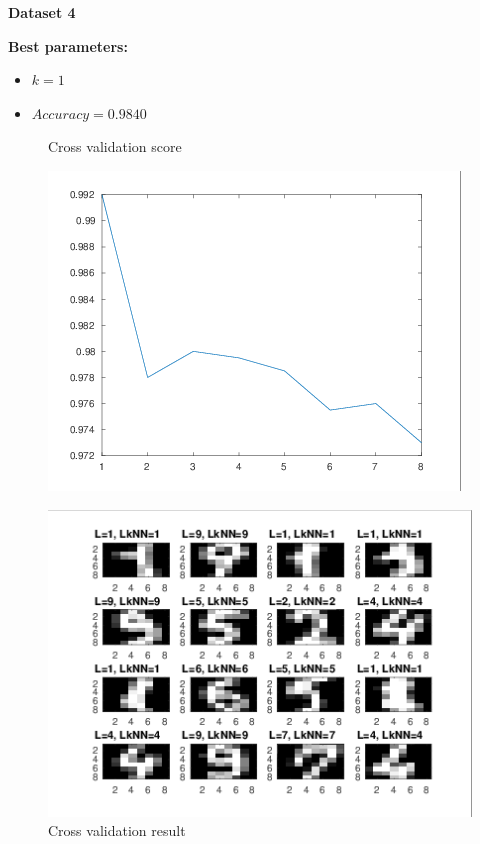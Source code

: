 \documentclass[a4paper,12pt]{article}
\begin{document}
\noindent \textbf{Dataset 4}

\textbf{Best parameters:}
\begin{itemize}
\item $k = 1$
\item $Accuracy = 0.9840$
\end{itemize}

\begin{figure}[H]
\centering
  \begin{minipage}[]{0.49\textwidth}
  \caption{Cross validation score}\label{fig:kNN-4-cv-score}
  \includegraphics[width=\textwidth]{figures/kNN_4_score.png}
  \end{minipage}
  \begin{minipage}[]{0.49\textwidth}
  \caption{Cross validation result}\label{fig:kNN-4-cv}
  \includegraphics[width=\textwidth]{figures/kNN_4_cv.png}
  \end{minipage}
\end{figure}
\end{document}
